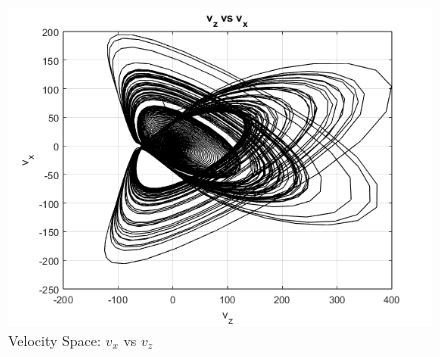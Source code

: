 \documentclass[%
reprint,
amsmath,amssymb,
aps,
floatfix,
]{revtex4-2}
\begin{document}
	\begin{figure}[htbp]
		\centering
		\includegraphics[width=0.8\linewidth]{vx_vs_vz.png}
		\caption{Velocity Space: $v_x$ vs $v_z$}
		\label{fig:vx_vz}
	\end{figure}
	
		
	\FloatBarrier
	
\end{document}

